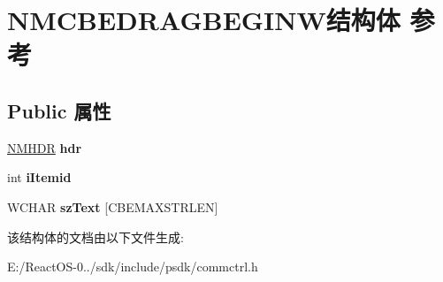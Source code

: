 \hypertarget{struct_n_m_c_b_e_d_r_a_g_b_e_g_i_n_w}{}\section{N\+M\+C\+B\+E\+D\+R\+A\+G\+B\+E\+G\+I\+N\+W结构体 参考}
\label{struct_n_m_c_b_e_d_r_a_g_b_e_g_i_n_w}
\subsection*{Public 属性}
\begin{DoxyCompactItemize}
\item 
\mbox{\label{struct_n_m_c_b_e_d_r_a_g_b_e_g_i_n_w_afdb6635a21e90ec4a0287b6112658590}} 
\hyperlink{structtag_n_m_h_d_r}{N\+M\+H\+DR} {\bfseries hdr}
\item 
\mbox{\label{struct_n_m_c_b_e_d_r_a_g_b_e_g_i_n_w_abcab2fa31e24efdf47b075b640cf23e4}} 
int {\bfseries i\+Itemid}
\item 
\mbox{\label{struct_n_m_c_b_e_d_r_a_g_b_e_g_i_n_w_a1cf4cc9a1a4b2083d509e3368a5066b7}} 
W\+C\+H\+AR {\bfseries sz\+Text} \mbox{[}C\+B\+E\+M\+A\+X\+S\+T\+R\+L\+EN\mbox{]}
\end{DoxyCompactItemize}


该结构体的文档由以下文件生成\+:\begin{DoxyCompactItemize}
\item 
E\+:/\+React\+O\+S-\/0../sdk/include/psdk/commctrl.\+h\end{DoxyCompactItemize}
